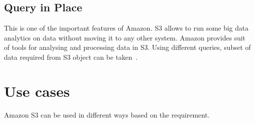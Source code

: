 \subsection{Query in Place} 

This is one of the important features of Amazon. S3 allows to run some
big data analytics on data without moving it to any other system.
Amazon provides suit of tools for analysing and processing data in
S3. Using different queries, subset of data required from S3 object
can be taken~\cite{hid-sp18-420-amazon-S3}.

\section{Use cases}
Amazon S3 can be used in different ways based on the requirement. 

